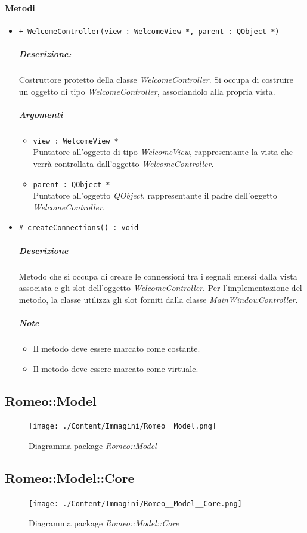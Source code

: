 	\paragraph{\color{black}Metodi}
		\begin{itemize}
			\item \color{blue} \verb!+ WelcomeController(view : WelcomeView *, parent : QObject *)!
			\color{black}
			\subparagraph{Descrizione:} Costruttore protetto della classe \textsl{WelcomeController}. Si occupa di costruire un oggetto di tipo \textsl{WelcomeController}, associandolo alla propria vista.
			\color{black}
			\subparagraph{Argomenti}
			\begin{itemize}
				\item \color{RoyalPurple} \verb!view : WelcomeView *!\\				
\color{black} Puntatore all'oggetto di tipo \textsl{WelcomeView}, rappresentante la vista che verrà controllata dall'oggetto \textsl{WelcomeController}.
				\item \color{RoyalPurple} \verb!parent : QObject *!\\				
\color{black} Puntatore all'oggetto \textsl{QObject}, rappresentante il padre dell'oggetto \textsl{WelcomeController}.
			\end{itemize}
			\item \color{blue} \verb!# createConnections() : void!
			\color{black}
			\subparagraph{Descrizione} Metodo che si occupa di creare le connessioni tra i segnali emessi dalla vista associata e gli slot\g{} dell'oggetto \textsl{WelcomeController}. Per l'implementazione del metodo, la classe utilizza gli slot forniti dalla classe \textsl{MainWindowController}.
			\subparagraph{Note}
			\begin{itemize}
				\item Il metodo deve essere marcato come costante.
				\item Il metodo deve essere marcato come virtuale.
			\end{itemize}
		\end{itemize}
\subsection{Romeo::Model}
	\begin{figure} [!h]
		\centering
		\texttt{[image: ./Content/Immagini/Romeo\_\_Model.png]}
		\caption{Diagramma package \textsl{Romeo::Model}}
	\end{figure}
\subsection{Romeo::Model::Core}
	\begin{figure} [!h]
		\centering
		\texttt{[image: ./Content/Immagini/Romeo\_\_Model\_\_Core.png]}
		\caption{Diagramma package \textsl{Romeo::Model::Core}}
	\end{figure}
